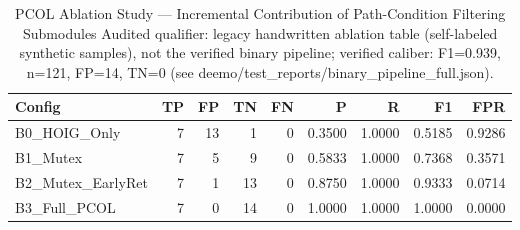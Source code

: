 \begin{table}[htbp]
\centering
\caption{PCOL Ablation Study --- Incremental Contribution of Path-Condition Filtering Submodules Audited qualifier: legacy handwritten ablation table (self-labeled synthetic samples), not the verified binary pipeline; verified caliber: F1=0.939, n=121, FP=14, TN=0 (see deemo/test_reports/binary_pipeline_full.json).}
\label{tab:pcol_ablation}
\begin{tabular}{lrrrrrrrr}
\toprule
Config & TP & FP & TN & FN & P & R & F1 & FPR \\
\midrule
  B0_HOIG_Only & 7 & 13 & 1 & 0 & 0.3500 & 1.0000 & 0.5185 & 0.9286 \\ %
  B1_Mutex & 7 & 5 & 9 & 0 & 0.5833 & 1.0000 & 0.7368 & 0.3571 \\ %
  B2_Mutex_EarlyRet & 7 & 1 & 13 & 0 & 0.8750 & 1.0000 & 0.9333 & 0.0714 \\ %
  B3_Full_PCOL & 7 & 0 & 14 & 0 & 1.0000 & 1.0000 & 1.0000 & 0.0000 \\ %
\bottomrule
\end{tabular}
\end{table}
